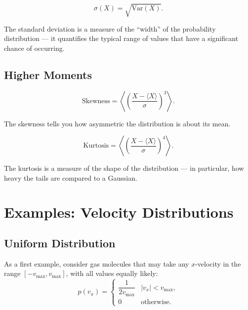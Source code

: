 \begin{definition}
\begin{equation}
    \sigma(X) = \sqrt{\mathrm{Var}(X)}.
\end{equation}
\end{definition}
The standard deviation is a measure of the ``width'' of the probability distribution — it quantifies the typical range of values that have a significant chance of occurring.

\subsection{Higher Moments}

\begin{definition}[Skewness]
\begin{equation}
    \text{Skewness} = \left\langle\left(\frac{X - \langle X\rangle}{\sigma}\right)^3\right\rangle.
\end{equation}
\end{definition}
The skewness tells you how asymmetric the distribution is about its mean.

\begin{definition}[Kurtosis]
\begin{equation}
    \text{Kurtosis} = \left\langle\left(\frac{X - \langle X\rangle}{\sigma}\right)^4\right\rangle.
\end{equation}
\end{definition}
The kurtosis is a measure of the shape of the distribution — in particular, how heavy the tails are compared to a Gaussian.

\section{Examples: Velocity Distributions}

\subsection{Uniform Distribution}

As a first example, consider gas molecules that may take any $x$-velocity in the range $[-v_{\max}, v_{\max}]$, with all values equally likely:
\begin{equation}
    p(v_x) =
    \begin{cases}
        \dfrac{1}{2v_{\max}} & |v_x| < v_{\max}, \\[6pt]
        0 & \text{otherwise.}
    \end{cases}
\end{equation}

